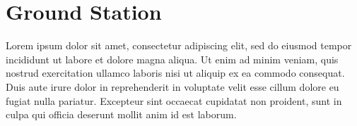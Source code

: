 \sectionfont{\fontsize{14}{14}\selectfont}
\section{Ground Station}
Lorem ipsum dolor sit amet, consectetur adipiscing elit, sed do eiusmod tempor incididunt ut labore et dolore magna aliqua. Ut enim ad minim veniam, quis nostrud exercitation ullamco laboris nisi ut aliquip ex ea commodo consequat. Duis aute irure dolor in reprehenderit in voluptate velit esse cillum dolore eu fugiat nulla pariatur. Excepteur sint occaecat cupidatat non proident, sunt in culpa qui officia deserunt mollit anim id est laborum.


